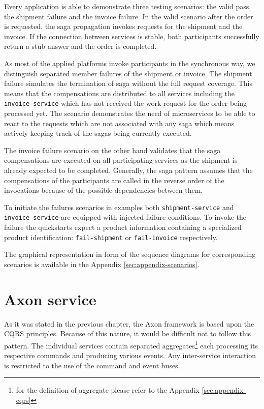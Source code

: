 \documentclass[oneside,
  digital, %
  table,   %
  nolof,     %
  nolot,     %
]{fithesis3}
\begin{document}
Every application is able to demonstrate three testing scenarios: the valid pass, the shipment failure and the invoice failure. In the valid scenario after the order is requested, the saga propagation invokes requests for the shipment and the invoice. If the connection between services is stable, both participants successfully return a stub answer and the order is completed. 

As most of the applied platforms invoke participants in the synchronous way, we distinguish separated member failures of the shipment or invoice. The shipment failure simulates the termination of saga without the full request coverage. This means that the compensations are distributed to all services including the \texttt{invoice-service} which has not received the work request for the order being processed yet. The scenario demonstrates the need of microservices to be able to react to the requests which are not associated with any saga which means actively keeping track of the sagas being currently executed. 

The invoice failure scenario on the other hand validates that the saga compensations are executed on all participating services as the shipment is already expected to be completed. Generally, the saga pattern assumes that the compensations of the participants are called in the reverse order of the invocations because of the possible dependencies between them.

To initiate the failures scenarios in examples both \texttt{shipment-service} and \texttt{invoice-service} are equipped with injected failure conditions. To invoke the failure the quickstarts expect a product information containing a specialized product identification: \texttt{fail-shipment} or \texttt{fail-invoice} respectively. 

The graphical representation in form of the sequence diagrams for corresponding scenarios is available in the Appendix \ref{sec:appendix-scenarios}.

\section{Axon service}

As it was stated in the previous chapter, the Axon framework is based upon the CQRS principles. Because of this nature, it would be difficult not to follow this pattern. The individual services contain separated aggregates\footnote{for the definition of aggregate please refer to the Appendix \ref{sec:appendix-cqrs}} each processing its respective commands and producing various events. Any inter-service interaction is restricted to the use of the command and event buses.
\end{document}
